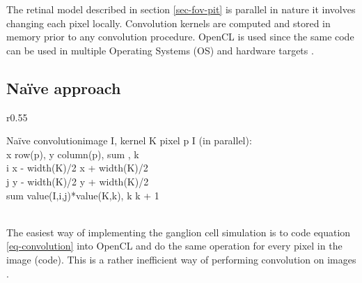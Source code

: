 The retinal model described in section \ref{sec-fov-pit} is
parallel in nature it involves changing each pixel locally.
Convolution kernels are computed and stored in memory prior 
to any convolution procedure. OpenCL is used since 
the same code can be used in multiple Operating Systems (OS) 
and hardware targets \cite{munshi2011opencl}.

\subsection{Na\"{i}ve approach}
\begin{wrapfigure}{r}{0.55\textwidth}
    \vspace{-26pt}
    \begin{minipage}{0.55\textwidth}
        \begin{pseudocode}{Na\"ive convolution}{image \; I,\; kernel\; K}
            \label{code-naive-convolution}
            \FOREACH pixel\; p \in I \DO \textrm{(in parallel):}\\
            \hspace{0.7cm} x \GETS row(p), \; y \GETS column(p),\; sum ,\; k \\
            \hspace{0.7cm} \FOR i \GETS x - width(K)/2 \TO x + width(K)/2 \\
            \hspace{1.4cm} \FOR j \GETS y - width(K)/2 \TO y + width(K)/2 \\
            \hspace{2.1cm} sum \GETS value(I,i,j)*value(K,k),\; k \GETS k + 1 \\
            \hspace{0.7cm} \\
        \end{pseudocode}
    \vspace*{-25pt}
    \end{minipage}
    \vspace*{-0.7cm}
\end{wrapfigure}

The easiest way of implementing the ganglion cell simulation
is to code equation \ref{eq-convolution} into OpenCL and do
the same operation for every pixel in the image (code). This is a
rather inefficient way of performing convolution on images 
\cite{cmsoft-opencl, reda-opencl}. \\

